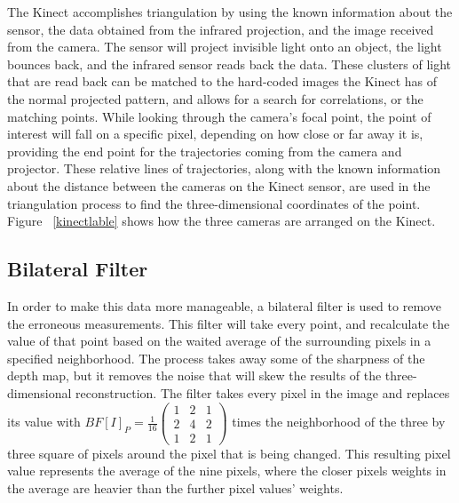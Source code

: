 \documentclass[pdftex,10.5pt]{report}
\begin{document}
The Kinect accomplishes triangulation by using the known information about the sensor, the data obtained from the infrared projection, and the image received from the camera. The sensor will project invisible light onto an object, the light bounces back, and the infrared sensor reads back the data. These clusters of light that are read back can be matched to the hard-coded images the Kinect has of the normal projected pattern, and allows for a search for correlations, or the matching points. While looking through the camera's focal point, the point of interest will fall on a specific pixel, depending on how close or far away it is, providing the end point for the trajectories coming from the camera and projector. These relative lines of trajectories, along with the known information about the distance between the cameras on the Kinect sensor, are used in the triangulation process to find the three-dimensional coordinates of the point. Figure ~\ref{kinectlable} shows how the three cameras are arranged on the Kinect.

\subsection{Bilateral Filter}
In order to make this data more manageable, a bilateral filter is used to remove the erroneous measurements. This filter will take every point, and recalculate the value of that point based on the waited average of the surrounding pixels in a specified neighborhood. The process takes away some of the sharpness of the depth map, but it removes the noise that will skew the results of the three-dimensional reconstruction. The filter takes every pixel in the image and replaces its value with $BF[I]_{P} = \frac{1}{16} \left( \begin{array}{ccc}
1 & 2 & 1 \\
2 & 4 & 2 \\
1 & 2 & 1 \end{array}  \right) $ times the neighborhood of the three by three square of pixels around the pixel that is being changed. This resulting pixel value represents the average of the nine pixels, where the closer pixels weights in the average are heavier than the further pixel values' weights.  
\end{document}
